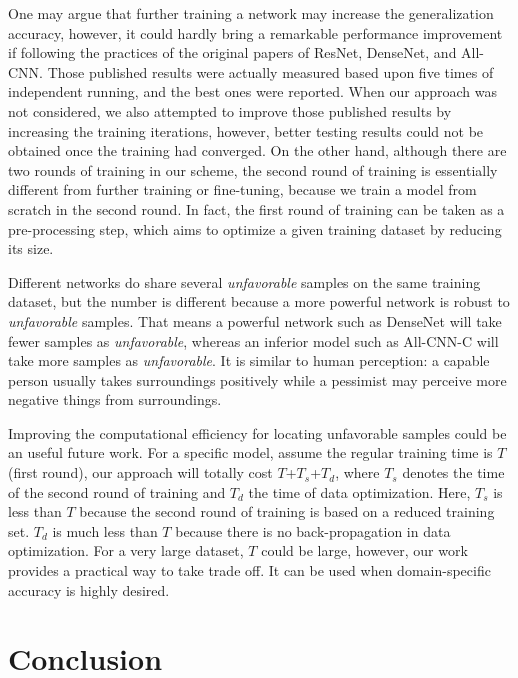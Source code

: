\documentclass[10pt, conference, letterpaper]{IEEEtran}
\begin{document}
One may argue that further training a network may increase the generalization accuracy, however, it could hardly bring a remarkable performance improvement if following the practices of the original papers of ResNet, DenseNet, and All-CNN. Those published results were actually measured based upon five times of independent running, and the best ones were reported. When our approach was not considered, we also attempted to improve those published results by increasing the training iterations, however, better testing results could not be obtained once the training had converged. On the other hand, although there are two rounds of training in our scheme, the second round of training is essentially different from further training or fine-tuning, because we train a model from scratch in the second round. In fact, the first round of training can be taken as a pre-processing step, which aims to optimize a given training dataset by reducing its size. 

Different networks do share several \emph{unfavorable} samples on the same training dataset, but the number is different because a more powerful network is robust to \emph{unfavorable} samples. That means a powerful network such as DenseNet will take fewer samples as \emph{unfavorable}, whereas an inferior model such as All-CNN-C will take more samples as \emph{unfavorable}. It is similar to human perception: a capable person usually takes surroundings positively while a pessimist may perceive more negative things from surroundings. 

Improving the computational efficiency for locating unfavorable samples could be an useful future work. For a specific model, assume the regular training time is $T$ (first round), our approach will totally cost $T$+$T_{s}$+$T_{d}$, where $T_{s}$ denotes the time of the second round of training and $T_{d}$ the time of data optimization. Here,  $T_{s}$ is less than $T$ because the second round of training is based on a reduced training set. $T_{d}$ is much less than $T$ because there is no back-propagation in data optimization. For a very large dataset, $T$ could be large, however, our work provides a practical way to take trade off. It can be used when domain-specific accuracy is highly desired.  


 
\section{Conclusion}
\label{conclusion}
\end{document}
